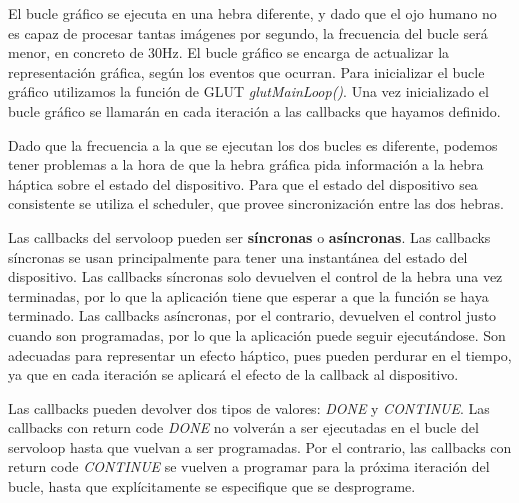\documentclass[a4paper,11pt, oneside]{book}
\begin{document}
El bucle gráfico se ejecuta en una hebra diferente, y dado que el ojo humano no es capaz de procesar tantas imágenes por segundo, la frecuencia del bucle será menor, en concreto de 30Hz. El bucle gráfico se encarga de actualizar la representación gráfica, según los eventos que ocurran. Para inicializar el bucle gráfico utilizamos la función de GLUT \textit{glutMainLoop()}. Una vez inicializado el bucle gráfico se llamarán en cada iteración a las callbacks que hayamos definido.

Dado que la frecuencia a la que se ejecutan los dos bucles es diferente, podemos tener problemas a la hora de que la hebra gráfica pida información a la hebra háptica sobre el estado del dispositivo. Para que el estado del dispositivo sea consistente se utiliza el scheduler, que provee sincronización entre las dos hebras.

Las callbacks del servoloop pueden ser \textbf{síncronas} o \textbf{asíncronas}. Las callbacks síncronas se usan principalmente para tener una instantánea del estado del dispositivo. Las callbacks síncronas solo devuelven el control de la hebra una vez terminadas, por lo que la aplicación tiene que esperar a que la función se haya terminado. Las callbacks asíncronas, por el contrario, devuelven el control justo cuando son programadas, por lo que la aplicación puede seguir ejecutándose. Son adecuadas para representar un efecto háptico, pues pueden perdurar en el tiempo, ya que en cada iteración se aplicará el efecto de la callback al dispositivo.

Las callbacks pueden devolver dos tipos de valores: \textit{DONE} y \textit{CONTINUE}. Las callbacks con return code \textit{DONE} no volverán a ser ejecutadas en el bucle del servoloop hasta que vuelvan a ser programadas. Por el contrario, las callbacks con return code \textit{CONTINUE} se vuelven a programar para la próxima iteración del bucle, hasta que explícitamente se especifique que se desprograme.
\end{document}
